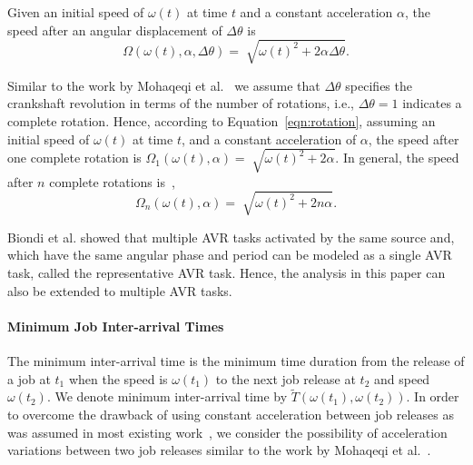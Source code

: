 \begin{property}
Given an initial speed of $\omega(t)$ at time $t$ and a constant acceleration $\alpha$,
the speed after an angular displacement of $\Delta \theta$
is~\cite{verma_concepts_2010, biondi_exact_2014}
\begin{equation}
\label{eqn:rotation}
    \Omega(\omega(t),\alpha, \Delta \theta) = \sqrt[]{\omega(t)^2+2\alpha \Delta \theta}.
\end{equation}

Similar to the work by Mohaqeqi et al.~\cite{mohaqeqi_refinement_2017} we assume that $\Delta \theta$ specifies the crankshaft revolution in terms of the number of rotations, i.e., $ \Delta \theta = 1$ indicates a complete rotation.
Hence, according to Equation~\ref{eqn:rotation}, assuming an initial speed of $\omega(t)$ at time $t$, and a constant acceleration of $\alpha$, the speed after one complete rotation is $\Omega_1(\omega(t),\alpha) = \sqrt[]{\omega(t)^2+2\alpha}$.
In general, the speed after $n$ complete rotations is~\cite{mohaqeqi_refinement_2017},
\begin{equation}
\label{eqn:rotation-n}
    \Omega_n(\omega(t),\alpha) = \sqrt[]{\omega(t)^2+2 n \alpha}.
\end{equation}
\end{property}


Biondi et al. \cite{biondi_response-time_2015} showed that multiple AVR tasks activated by the same source and, which have the same angular phase and period can be modeled as a single AVR task, called the representative AVR task.
Hence, the analysis in this paper can also be extended to multiple AVR tasks.


\paragraph{Minimum Job Inter-arrival Times}

The minimum inter-arrival time is the minimum time duration from the release of a job at $t_1$ when the speed is $\omega(t_1)$ to the next job release at $t_2$ and speed $\omega(t_2)$. We denote minimum inter-arrival time by $\widetilde{T}(\omega(t_1),\omega(t_2))$.
In order to overcome the drawback of using constant acceleration between job releases as was assumed in most existing work~\cite{biondi_response-time_2015,biondi_feasibility_2015,biondi_exact_2014}, we consider the possibility of acceleration variations between two job releases similar to the work by Mohaqeqi et al.~\cite{mohaqeqi_refinement_2017}.


